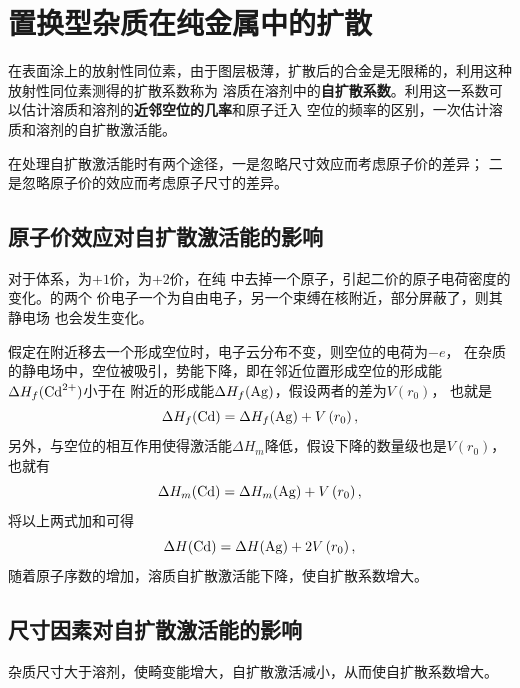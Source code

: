     \section{置换型杂质在纯金属中的扩散}
        在表面涂上的放射性同位素，由于图层极薄，扩散后的合金是无限稀的，利用这种放射性同位素测得的扩散系数称为
        溶质在溶剂中的\textbf{自扩散系数}。利用这一系数可以估计溶质和溶剂的\textbf{近邻空位的几率}和原子迁入
        空位的频率的区别，一次估计溶质和溶剂的自扩散激活能。
        
        在处理自扩散激活能时有两个途径，一是忽略尺寸效应而考虑原子价的差异；
        二是忽略原子价的效应而考虑原子尺寸的差异。

        \subsection{原子价效应对自扩散激活能的影响}
            对于体系，为$+1$价，为$+2$价，在纯
            中去掉一个原子，引起二价的原子电荷密度的变化。的两个
            价电子一个为自由电子，另一个束缚在核附近，部分屏蔽了，则其静电场
            也会发生变化。

            假定在附近移去一个形成空位时，电子云分布不变，则空位的电荷为$-e$，
            在杂质的静电场中，空位被吸引，势能下降，即在邻近位置形成空位的形成能$\Delta H_f(\ce{Cd^{2+}})$小于在
            附近的形成能$\Delta H_f(\ce{Ag})$，假设两者的差为$V(r_0)$，
            也就是
            \begin{equation}
                \Delta H_{f}(\ce{Cd})=\Delta H_{f}(\ce{Ag})+V\left(r_{0}\right),
            \end{equation}
            另外，与空位的相互作用使得激活能$\Delta H_m$降低，假设下降的数量级也是$V(r_0)$，
            也就有
            \begin{equation}
                \Delta H_{m}(\ce{Cd})=\Delta H_{m}(\ce{Ag})+V\left(r_{0}\right),
            \end{equation}
            将以上两式加和可得
            \begin{equation}
                \Delta H(\ce{Cd})=\Delta H(\ce{Ag})+2V\left(r_{0}\right),                
            \end{equation}
            随着原子序数的增加，溶质自扩散激活能下降，使自扩散系数增大。
        \subsection{尺寸因素对自扩散激活能的影响}
            杂质尺寸大于溶剂，使畸变能增大，自扩散激活减小，从而使自扩散系数增大。

